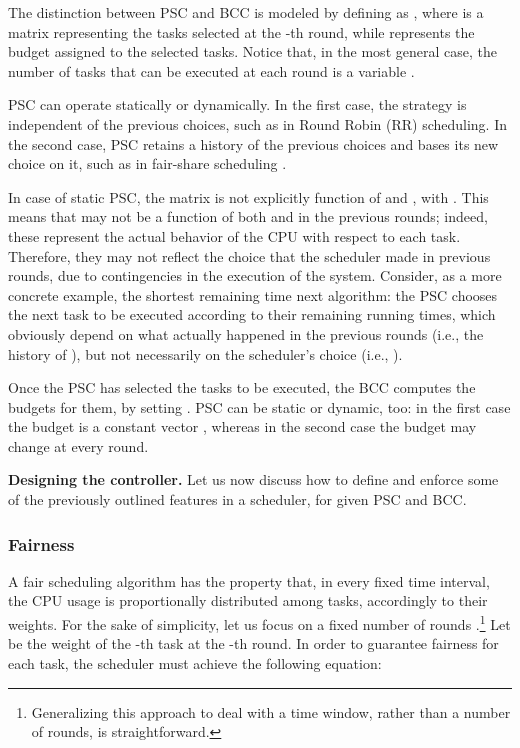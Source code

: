 \documentclass[a4paper]{article}
\begin{document}
The distinction between PSC and BCC is modeled by defining  as
, where  is a  matrix representing
the tasks selected at the -th round, while  represents
the budget assigned to the selected tasks. Notice that, in the most general
case, the number of tasks that can be executed at each round is a 
variable .

PSC can operate statically or dynamically.
In the first case, the strategy is independent of the previous choices,
such as in Round Robin (RR) scheduling. 
In the second case, PSC retains a history of the previous choices and bases its 
new choice on it, such as in fair-share scheduling \cite{KayLauder-1988a}.

In case of static PSC, the matrix  is not explicitly function of
 and , with . This means that  may not be
a function of both  and  in the previous rounds; indeed, these
represent the actual behavior of the CPU with respect to each task. Therefore, they may not reflect the choice that the scheduler made
in previous rounds, due to contingencies in the execution of the system.
Consider, as a more concrete example, the shortest remaining time next
algorithm: the PSC chooses the next task to be executed
according to their remaining running times, which obviously depend on what
actually happened in the previous rounds (i.e., the history of ),
but not necessarily on the scheduler's choice (i.e., ).

Once the PSC has selected the tasks to be executed, the BCC computes the
budgets for them, by setting . PSC can be static or dynamic, too: in the 
first case the budget is a constant vector , whereas in the second 
case the budget may change at every round. 

\textbf{Designing the controller.}
Let us now discuss how to define and enforce some of the previously outlined
features in a scheduler, for given PSC and BCC.

\subsubsection{Fairness}
A fair scheduling algorithm has the property that, in every fixed time interval,
the CPU usage is proportionally distributed among tasks, accordingly to their
weights. For the sake of simplicity, let us focus on a fixed number of rounds
.\footnote{Generalizing this approach to deal with a time window, rather 
than a number of rounds, is straightforward.}
Let  be the weight 
of the -th task at the -th round. In order to guarantee fairness for
each task, the scheduler must achieve the following equation:
\end{document}
